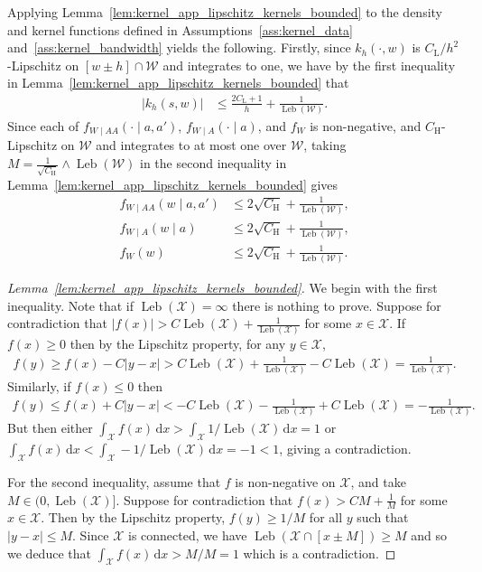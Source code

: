 \documentclass[11pt,lof]{puthesis}
\newcommand{\rH}{\ensuremath{\mathrm{H}}}
\newcommand{\rL}{\ensuremath{\mathrm{L}}}
\newcommand{\cX}{\ensuremath{\mathcal{X}}}
\newcommand{\cW}{\ensuremath{\mathcal{W}}}
\DeclareMathOperator{\Leb}{Leb}
\newcommand{\diff}[1]{\,\mathrm{d}#1}
\theoremstyle{break}
\theoremstyle{proof}
\newtheorem{proof}{Proof}
\begin{document}
Applying Lemma~\ref{lem:kernel_app_lipschitz_kernels_bounded}
to the density and kernel functions defined in
Assumptions~\ref{ass:kernel_data} and~\ref{ass:kernel_bandwidth}
yields the following.
Firstly, since $k_h(\cdot, w)$ is $C_\rL / h^2$-Lipschitz
on $[w \pm h] \cap \cW$ and integrates to one,
we have by the first inequality in
Lemma~\ref{lem:kernel_app_lipschitz_kernels_bounded} that
%
\begin{align*}
|k_h(s,w)|
&\leq \frac{2 C_\rL + 1}{h} + \frac{1}{\Leb(\cW)}.
\end{align*}
%
Since each of
$f_{W \mid AA}(\cdot \mid a,a')$,
$f_{W \mid A}(\cdot \mid a)$, and
$f_W$ is non-negative, and $C_\rH$-Lipschitz on $\cW$
and integrates to at most one over $\cW$,
taking $M = \frac{1}{\sqrt{C_\rH}} \wedge \Leb(\cW)$
in the second inequality in
Lemma~\ref{lem:kernel_app_lipschitz_kernels_bounded}
gives
%
\begin{align*}
f_{W \mid AA}(w \mid a,a')
&\leq 2 \sqrt{C_\rH} + \frac{1}{\Leb(\cW)}, \\
f_{W \mid A}(w \mid a)
&\leq 2 \sqrt{C_\rH} + \frac{1}{\Leb(\cW)}, \\
f_W(w)
&\leq 2 \sqrt{C_\rH} + \frac{1}{\Leb(\cW)}.
\end{align*}

\begin{proof}[Lemma~\ref{lem:kernel_app_lipschitz_kernels_bounded}]

We begin with the first inequality.
Note that if $\Leb(\cX) = \infty$ there is nothing to prove.
Suppose for contradiction that
$|f(x)| > C \Leb(\cX) + \frac{1}{\Leb(\cX)}$
for some $x \in \cX$.
If $f(x) \geq 0$
then by the Lipschitz property, for any $y \in \cX$,
%
\begin{align*}
f(y)
\geq f(x) - C|y-x|
> C \Leb(\cX) + \frac{1}{\Leb(\cX)} - C\Leb(\cX)
= \frac{1}{\Leb(\cX)}.
\end{align*}
%
Similarly, if $f(x) \leq 0$ then
%
\begin{align*}
f(y)
\leq f(x) + C|y-x|
< - C \Leb(\cX) - \frac{1}{\Leb(\cX)} + C\Leb(\cX)
= -\frac{1}{\Leb(\cX)}.
\end{align*}
%
But then either
$\int_\cX f(x) \diff{x} > \int_\cX 1/\Leb(\cX) \diff{x} = 1$
or
$\int_\cX f(x) \diff{x} < \int_\cX -1/\Leb(\cX) \diff{x} = -1 < 1$,
giving a contradiction.

For the second inequality,
assume that $f$ is non-negative on $\cX$,
and take $M \in \big(0, \Leb(\cX)\big]$.
Suppose for contradiction that
$f(x) > C M + \frac{1}{M}$
for some $x \in \cX$.
Then by the Lipschitz property, $f(y) \geq 1/M$
for all $y$ such that $|y - x| \leq M$.
Since $\cX$ is connected, we have
$\Leb(\cX \cap [x \pm M]) \geq M$
and so we deduce that
$\int_\cX f(x) \diff{x} > M/M = 1$
which is a contradiction.
\end{proof}
\end{document}
